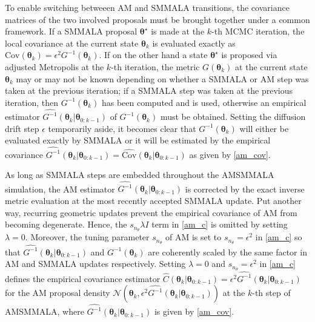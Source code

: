 \documentclass[twoside,11pt]{article}
\begin{document}
To enable switching betweeen AM and SMMALA transitions, the covariance matrices of the two involved proposals must be brought
together under a common framework. If a SMMALA proposal $\boldsymbol{\theta}^{\star}$ is made at the $k$-th MCMC iteration, 
the local covariance at the current state $\boldsymbol{\theta}_k$ is evaluated exactly as
$\mbox{Cov}(\boldsymbol{\theta}_{k})=\epsilon^2 G^{-1}(\boldsymbol{\theta}_{k})$. If on the other hand a state 
$\boldsymbol{\theta}^{\star}$ is proposed via adjusted Metropolis at the $k$-th iteration, the metric 
$G(\boldsymbol{\theta}_{k})$ at the current state $\boldsymbol{\theta}_k$ may or may not be known depending on whether a
SMMALA or AM step was taken at the previous iteration; if a SMMALA step was taken at the previous iteration, then 
$G^{-1}(\boldsymbol{\theta}_{k})$ has been computed and is used, otherwise an empirical estimator
$\widehat{G^{-1}}(\boldsymbol{\theta}_{k}|\boldsymbol{\theta}_{0:k-1})$ of $G^{-1}(\boldsymbol{\theta}_{k})$ must be 
obtained. Setting the diffusion drift step $\epsilon$ temporarily aside, it becomes clear that 
$G^{-1}(\boldsymbol{\theta}_{k})$ will either be evaluated exactly by SMMALA or it will be estimated by the empirical 
covariance
$
\widehat{G^{-1}}(\boldsymbol{\theta}_{k}|\boldsymbol{\theta}_{0:k-1})=
\widehat{\mbox{Cov}}(\boldsymbol{\theta}_{k}|\boldsymbol{\theta}_{0:k-1})
$
as given by \eqref{am_cov}.

As long as SMMALA steps are embedded throughout the AMSMMALA simulation, the AM estimator
$\widehat{G^{-1}}(\boldsymbol{\theta}_{k}|\boldsymbol{\theta}_{0:k-1})$ is corrected by the exact inverse metric evaluation 
at the most recently accepted SMMALA update. Put another way, recurring geometric updates prevent the empirical covariance of
AM from becoming degenerate. Hence, the $s_{n_{\theta}}\lambda I$ term in \eqref{am_c} is omitted by setting $\lambda=0$.
Moreover, the tuning parameter $s_{n_{\theta}}$ of AM is set to $s_{n_{\theta}}=\epsilon^2$ in \eqref{am_c} so that
$\widehat{G^{-1}}(\boldsymbol{\theta}_{k}|\boldsymbol{\theta}_{0:k-1})$ and $G^{-1}(\boldsymbol{\theta}_k)$ are coherently
scaled by the same factor in AM and SMMALA updates respectively. Setting $\lambda=0$ and $s_{n_{\theta}}=\epsilon^2$ in
\eqref{am_c} defines the empirical covariance estimator
$\hat{C}(\boldsymbol{\theta}_{k}|\boldsymbol{\theta}_{0:k-1})=
\epsilon^2\widehat{G^{-1}}(\boldsymbol{\theta}_{k}|\boldsymbol{\theta}_{0:k-1})$
for the AM proposal density
$\mathcal{N}(\boldsymbol{\theta}_{k}, \epsilon^2\widehat{G^{-1}}(\boldsymbol{\theta}_{k}|\boldsymbol{\theta}_{0:k-1}))$
at the $k$-th step of AMSMMALA, where $\widehat{G^{-1}}(\boldsymbol{\theta}_{k}|\boldsymbol{\theta}_{0:k-1})$ is given by 
\eqref{am_cov}.
\end{document}
